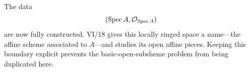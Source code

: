 \begin{example}
The data
\[
(\operatorname{Spec} A,\mathcal O_{\operatorname{Spec} A})
\]
are now fully constructed.  VI/18 gives this locally ringed space a name---the affine scheme associated to $A$---and studies its open affine pieces.  Keeping this boundary explicit prevents the basic-open-subsheme problem from being duplicated here.
\end{example}
